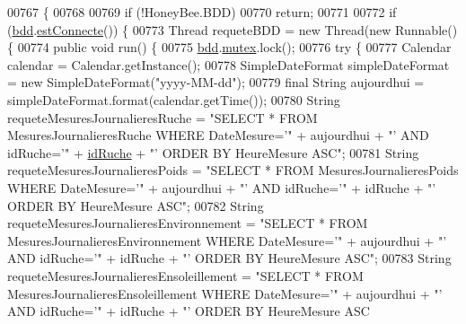 \begin{DoxyCode}
00767                                                                      \{
00768 
00769         \textcolor{keywordflow}{if} (!HoneyBee.BDD)
00770             \textcolor{keywordflow}{return};
00771 
00772         \textcolor{keywordflow}{if} (\hyperlink{classfr_1_1campus_1_1laurainc_1_1honeybee_1_1_ruche_a0eb43a2b63fb83e9d5af6cd6b754c7da}{bdd}.\hyperlink{classfr_1_1campus_1_1laurainc_1_1honeybee_1_1_base_de_donnees_a735f54c2c183a595c9a9a5ba947491f5}{estConnecte}()) \{
00773             Thread requeteBDD = \textcolor{keyword}{new} Thread(\textcolor{keyword}{new} Runnable() \{
00774                 \textcolor{keyword}{public} \textcolor{keywordtype}{void} run() \{
00775                     \hyperlink{classfr_1_1campus_1_1laurainc_1_1honeybee_1_1_ruche_a0eb43a2b63fb83e9d5af6cd6b754c7da}{bdd}.\hyperlink{classfr_1_1campus_1_1laurainc_1_1honeybee_1_1_base_de_donnees_a0dd6f285a11459c086adea6080bed282}{mutex}.lock();
00776                     \textcolor{keywordflow}{try} \{
00777                         Calendar calendar = Calendar.getInstance();
00778                         SimpleDateFormat simpleDateFormat = \textcolor{keyword}{new} SimpleDateFormat(\textcolor{stringliteral}{"yyyy-MM-dd"});
00779                         \textcolor{keyword}{final} String aujourdhui = simpleDateFormat.format(calendar.getTime());
00780                         String requeteMesuresJournalieresRuche = \textcolor{stringliteral}{"SELECT * FROM MesuresJournalieresRuche
       WHERE DateMesure='"} + aujourdhui + \textcolor{stringliteral}{"' AND idRuche='"} + \hyperlink{classfr_1_1campus_1_1laurainc_1_1honeybee_1_1_ruche_aee4d51dd1634b799427d89e168cdadf4}{idRuche} + \textcolor{stringliteral}{"' ORDER BY HeureMesure ASC"};
00781                         String requeteMesuresJournalieresPoids = \textcolor{stringliteral}{"SELECT * FROM MesuresJournalieresPoids
       WHERE DateMesure='"} + aujourdhui + \textcolor{stringliteral}{"' AND idRuche='"} + idRuche + \textcolor{stringliteral}{"' ORDER BY HeureMesure ASC"};
00782                         String requeteMesuresJournalieresEnvironnement = \textcolor{stringliteral}{"SELECT * FROM
       MesuresJournalieresEnvironnement WHERE DateMesure='"} + aujourdhui + \textcolor{stringliteral}{"' AND idRuche='"} + idRuche + \textcolor{stringliteral}{"' ORDER BY HeureMesure ASC"};
00783                         String requeteMesuresJournalieresEnsoleillement = \textcolor{stringliteral}{"SELECT * FROM
       MesuresJournalieresEnsoleillement WHERE DateMesure='"} + aujourdhui + \textcolor{stringliteral}{"' AND idRuche='"} + idRuche + \textcolor{stringliteral}{"' ORDER BY HeureMesure ASC
}
\end{DoxyCode}
